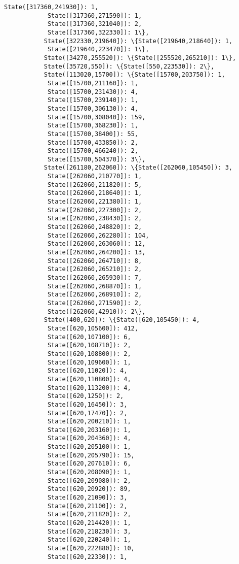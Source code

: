 \documentclass[11pt]{article}
\begin{document}
\begin{Verbatim}[commandchars=\\\{\}]
            State([317360,241930]): 1,
            State([317360,271590]): 1,
            State([317360,321040]): 2,
            State([317360,322330]): 1\},
           State([322330,219640]): \{State([219640,218640]): 1,
            State([219640,223470]): 1\},
           State([34270,255520]): \{State([255520,265210]): 1\},
           State([35720,550]): \{State([550,223530]): 2\},
           State([113020,15700]): \{State([15700,203750]): 1,
            State([15700,211160]): 1,
            State([15700,231430]): 4,
            State([15700,239140]): 1,
            State([15700,306130]): 4,
            State([15700,308040]): 159,
            State([15700,368230]): 1,
            State([15700,38400]): 55,
            State([15700,433850]): 2,
            State([15700,466240]): 2,
            State([15700,504370]): 3\},
           State([261180,262060]): \{State([262060,105450]): 3,
            State([262060,210770]): 1,
            State([262060,211820]): 5,
            State([262060,218640]): 1,
            State([262060,221380]): 1,
            State([262060,227300]): 2,
            State([262060,238430]): 2,
            State([262060,248820]): 2,
            State([262060,262280]): 104,
            State([262060,263060]): 12,
            State([262060,264200]): 13,
            State([262060,264710]): 8,
            State([262060,265210]): 2,
            State([262060,265930]): 7,
            State([262060,268870]): 1,
            State([262060,268910]): 2,
            State([262060,271590]): 2,
            State([262060,42910]): 2\},
           State([400,620]): \{State([620,105450]): 4,
            State([620,105600]): 412,
            State([620,107100]): 6,
            State([620,108710]): 2,
            State([620,108800]): 2,
            State([620,109600]): 1,
            State([620,11020]): 4,
            State([620,110800]): 4,
            State([620,113200]): 4,
            State([620,1250]): 2,
            State([620,16450]): 3,
            State([620,17470]): 2,
            State([620,200210]): 1,
            State([620,203160]): 1,
            State([620,204360]): 4,
            State([620,205100]): 1,
            State([620,205790]): 15,
            State([620,207610]): 6,
            State([620,208090]): 1,
            State([620,209080]): 2,
            State([620,20920]): 89,
            State([620,21090]): 3,
            State([620,21100]): 2,
            State([620,211820]): 2,
            State([620,214420]): 1,
            State([620,218230]): 3,
            State([620,220240]): 1,
            State([620,222880]): 10,
            State([620,22330]): 1,

\end{Verbatim}
\end{document}
